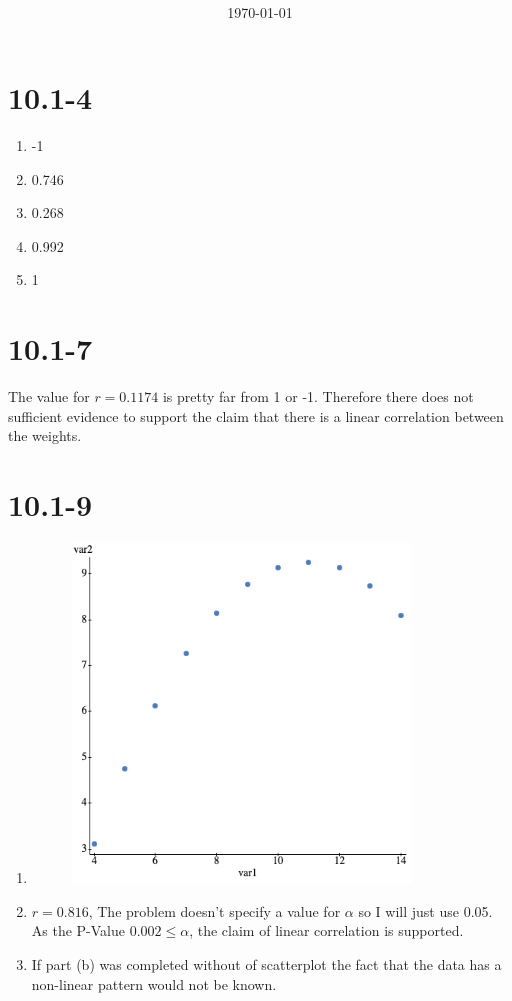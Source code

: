 \documentclass[12pt,fleqn]{article}
\title{\classdescription\ \\ \classname\ \\ $\ $ \\ \assignment}
\author{\authorname}
\date{\today}
\newcommand{\problemtenone}[1]{\vspace{5ex}\section*{10.1-#1}}
\begin{document}
\maketitle


\problemtenone{4}
\begin{enumerate}[label=\alph*)]
\item -1
\item 0.746
\item 0.268
\item 0.992
\item 1
\end{enumerate}


\problemtenone{7}
The value for $r = 0.1174$ is pretty far from 1 or -1. Therefore there does not sufficient evidence to support the claim that there is a linear correlation between the weights.

\pagebreak
\problemtenone{9}
\begin{enumerate}[label=\alph*.]
\item
  \begin{figure}[ht]
    \centering
    \includegraphics[width=9cm]{assets/scatterplot-1.png}
  \end{figure}

\item $r = 0.816$, The problem doesn't specify a value for $\alpha$ so I will just use 0.05. As the P-Value $0.002 \le \alpha$, the claim of linear correlation is supported.

\item If part (b) was completed without of scatterplot the fact that the data has a non-linear pattern would not be known.
\end{enumerate}
\end{document}
